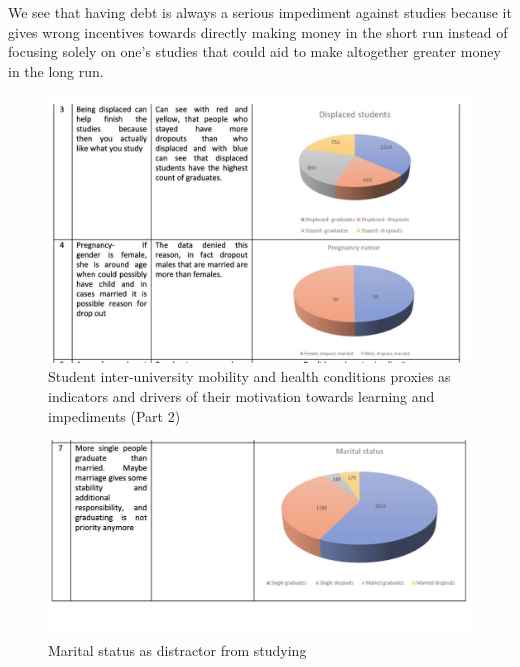 \documentclass[
  letterpaper,
  DIV=11,
  numbers=noendperiod]{scrartcl}
\begin{document}
We see that having debt is always a serious impediment against studies
because it gives wrong incentives towards directly making money in the
short run instead of focusing solely on one's studies that could aid to
make altogether greater money in the long run.

\begin{figure}

{\centering \includegraphics{./figs/reasons2.jpg}

}

\caption{\label{fig-word-2}Student inter-university mobility and health
conditions proxies as indicators and drivers of their motivation towards
learning and impediments (Part 2)}

\end{figure}

\begin{figure}

{\centering \includegraphics{./figs/rasons-3.jpg}

}

\caption{\label{fig-word-3}Marital status as distractor from studying}

\end{figure}
\end{document}
